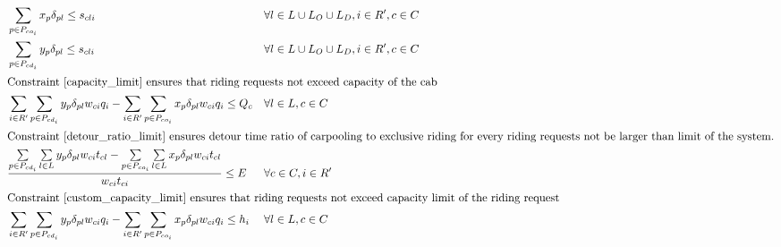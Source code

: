 \begin{align}
  & \sum\limits_{p \in P_{co_i}} x_{p} \delta_{pl} \leq s_{cli} && \forall l \in L \cup L_O \cup L_D, i \in R', c \in C \label{overlap_limit_origin} \\
  & \sum\limits_{p \in P_{cd_i}} y_{p} \delta_{pl} \leq s_{cli} && \forall l \in L \cup L_O \cup L_D, i \in R', c \in C \label{overlap_limit_destination} \\
  \intertext{Constraint \eqref{capacity_limit} ensures that riding requests not exceed capacity of the cab}
  & \sum\limits_{i \in R'} \sum\limits_{p \in P_{cd_i}} y_{p} \delta_{pl} w_{ci} q_i - \sum\limits_{i \in R'} \sum\limits_{p \in P_{co_i}} x_{p} \delta_{pl} w_{ci} q_i \leq Q_c && \forall l \in L, c \in C \label{capacity_limit} \\
  \intertext{Constraint \eqref{detour_ratio_limit} ensures detour time ratio of carpooling to exclusive riding for every riding requests not be larger than limit of the system.}
  & \frac{\sum\limits_{p \in P_{cd_i}} \sum\limits_{l \in L} y_{p} \delta_{pl} w_{ci} t_{cl} - \sum\limits_{p \in P_{co_i}} \sum\limits_{l \in L} x_{p} \delta_{pl} w_{ci} t_{cl}}{w_{ci} t_{ci}} \leq E && \forall c \in C, i \in R' \label{detour_ratio_limit} \\
  \intertext{Constraint \eqref{custom_capacity_limit} ensures that riding requests not exceed capacity limit of the riding request}
  & \sum\limits_{i \in R'} \sum\limits_{p \in P_{cd_i}} y_{p} \delta_{pl} w_{ci} q_i - \sum\limits_{i \in R'} \sum\limits_{p \in P_{co_i}} x_{p} \delta_{pl} w_{ci} q_i \leq h_i && \forall l \in L, c \in C \label{custom_capacity_limit}
\end{align}
